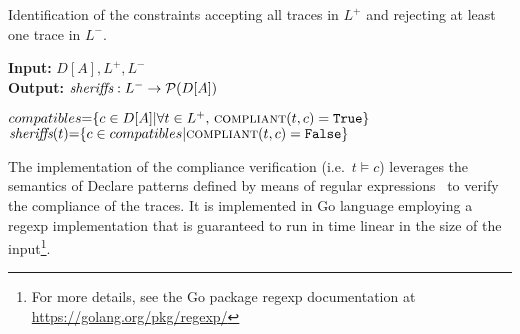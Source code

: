 \makeatletter
\algrenewcommand\ALG@beginalgorithmic{\footnotesize}
\makeatother

\begin{algorithm}
    \caption{Identification of the constraints accepting all traces in $L^+$ and rejecting at least one trace in $L^-$.}
    \label{algcand}
    \textbf{Input:}  $D[A], L^+, L^-$\\
    \textbf{Output:} $\textit{sheriffs} : L^- \rightarrow \mathcal{P}({D[A]})$
    	\begin{algorithmic}[1] 
   	\State ${compatibles}{=}\{c \in D[A]| \forall t \in L^+,\, \Call{compliant}{t,c} = \texttt{True}\}$ 
	\label{algcand:candidates}
		\State $\textit{\sheriff}(t){=}\{c \in {compatibles} | \Call{compliant}{t,c} = \texttt{False}\}$\label{algcand:choices}
	\EndFor
	\State \Return \textit{\sheriff}
    \EndProcedure
    \end{algorithmic}
\end{algorithm}

\makeatletter
\algrenewcommand\ALG@beginalgorithmic{\normalsize}
\makeatother

The implementation of the compliance verification  (i.e.\ $t\models c$) leverages the semantics of Declare patterns defined by means of regular expressions \cite{2017-DiCiccio}%
~to verify the compliance of the traces. It is implemented in Go language employing a regexp implementation that is guaranteed to run in time linear in the size of the input\footnote{For more details, see the Go package regexp documentation at \url{https://golang.org/pkg/regexp/}}.
\lstset{language=Prolog}

